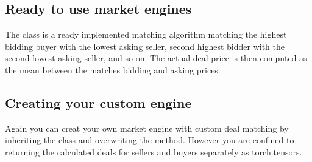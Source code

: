 \documentclass[letterpaper,10pt,english]{sphinxmanual}
\begin{document}
\subsection{Ready to use market engines}
\label{\detokenize{MultiAgentMarketRL:ready-to-use-market-engines}}
\sphinxAtStartPar
The  class is a ready implemented matching algorithm matching the highest bidding buyer with the
lowest asking seller, second highest bidder with the second lowest asking seller, and so on. The actual deal price is
then computed as the mean between the matches bidding and asking prices.


\subsection{Creating your custom engine}
\label{\detokenize{MultiAgentMarketRL:creating-your-custom-engine}}
\sphinxAtStartPar
Again you can creat your own market engine with custom deal matching by inheriting the  class and
overwriting the  method. However you are confined to returning the calculated deals for sellers and
buyers separately as torch.tensors.
\end{document}

